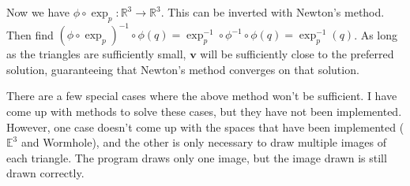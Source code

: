



Now we have $\phi\circ\exp_p: \mathbb{R}^3 \to \mathbb{R}^3$. This can be inverted with Newton's method. Then find $(\phi\circ\exp_p)^{-1}\circ\phi(q) = \exp_p^{-1}\circ\phi^{-1}\circ\phi(q) = \exp_p^{-1}(q)$. As long as the triangles are sufficiently small, $\textbf{v}$ will be sufficiently close to the preferred solution, guaranteeing that Newton's method converges on that solution.

There are a few special cases where the above method won't be sufficient. I have come up with methods to solve these cases, but they have not been implemented. However, one case doesn't come up with the spaces that have been implemented ($\mathbb{E}^3$ and Wormhole), and the other is only necessary to draw multiple images of each triangle. The program draws only one image, but the image drawn is still drawn correctly.

